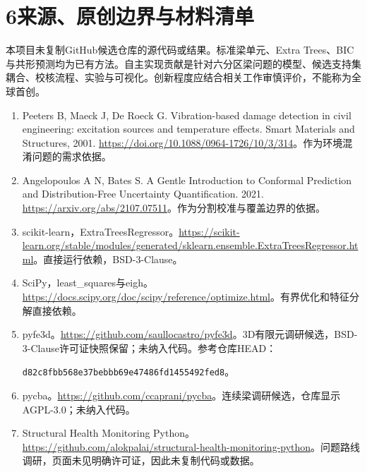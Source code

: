 \documentclass[UTF8,a4paper,11pt,fontset=fandol]{ctexart}
\begin{document}
\section*{6\quad 来源、原创边界与材料清单}
本项目未复制GitHub候选仓库的源代码或结果。标准梁单元、Extra Trees、BIC与共形预测均为已有方法。自主实现贡献是针对六分区梁问题的模型、候选支持集耦合、校核流程、实验与可视化。创新程度应结合相关工作审慎评价，不能称为全球首创。
\begin{enumerate}[leftmargin=2em]
\item Peeters B, Maeck J, De Roeck G. Vibration-based damage detection in civil engineering: excitation sources and temperature effects. Smart Materials and Structures, 2001. \url{https://doi.org/10.1088/0964-1726/10/3/314}。作为环境混淆问题的需求依据。
\item Angelopoulos A N, Bates S. A Gentle Introduction to Conformal Prediction and Distribution-Free Uncertainty Quantification. 2021. \url{https://arxiv.org/abs/2107.07511}。作为分割校准与覆盖边界的依据。
\item scikit-learn，ExtraTreesRegressor。\url{https://scikit-learn.org/stable/modules/generated/sklearn.ensemble.ExtraTreesRegressor.html}。直接运行依赖，BSD-3-Clause。
\item SciPy，least\_squares与eigh。\url{https://docs.scipy.org/doc/scipy/reference/optimize.html}。有界优化和特征分解直接依赖。
\item pyfe3d。\url{https://github.com/saullocastro/pyfe3d}。3D有限元调研候选，BSD-3-Clause许可证快照保留；未纳入代码。参考仓库HEAD：\par\nolinkurl{d82c8fbb568e37bebbb69e47486fd1455492fed8}。
\item pycba。\url{https://github.com/ccaprani/pycba}。连续梁调研候选，仓库显示AGPL-3.0；未纳入代码。
\item Structural Health Monitoring Python。\url{https://github.com/alokpalai/structural-health-monitoring-python}。问题路线调研，页面未见明确许可证，因此未复制代码或数据。
\end{enumerate}
\end{document}
